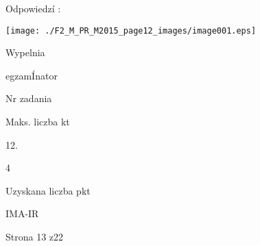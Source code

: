 \documentclass[a4paper,12pt]{article}
\begin{document}
Odpowiedzí :
\begin{center}
\texttt{[image: ./F2\_M\_PR\_M2015\_page12\_images/image001.eps]}
\end{center}
Wypelnia

egzamÍnator

Nr zadania

Maks. liczba kt

12.

4

Uzyskana liczba pkt

IMA-IR

Strona 13 z22
\end{document}
